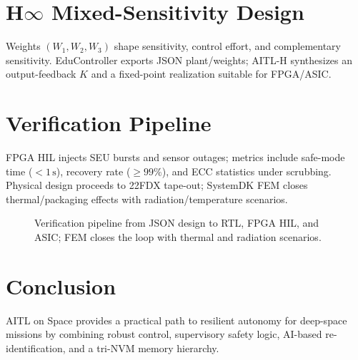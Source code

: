 \documentclass[conference]{IEEEtran}
\begin{document}
\section{H$\infty$ Mixed-Sensitivity Design}
Weights $(W_1,W_2,W_3)$ shape sensitivity, control effort, and complementary sensitivity. EduController exports JSON plant/weights; AITL-H synthesizes an output-feedback $K$ and a fixed-point realization suitable for FPGA/ASIC.

\section{Verification Pipeline}
FPGA HIL injects SEU bursts and sensor outages; metrics include safe-mode time ($<1\,\mathrm{s}$), recovery rate ($\geq 99\%$), and ECC statistics under scrubbing. Physical design proceeds to 22FDX tape-out; SystemDK FEM closes thermal/packaging effects with radiation/temperature scenarios.

\begin{figure}[!t]
\centering
{}
\caption{Verification pipeline from JSON design to RTL, FPGA HIL, and ASIC; FEM closes the loop with thermal and radiation scenarios.}
\label{fig:flow}
\end{figure}

\section{Conclusion}
AITL on Space provides a practical path to resilient autonomy for deep-space missions by combining robust control, supervisory safety logic, AI-based re-identification, and a tri-NVM memory hierarchy.
\end{document}
